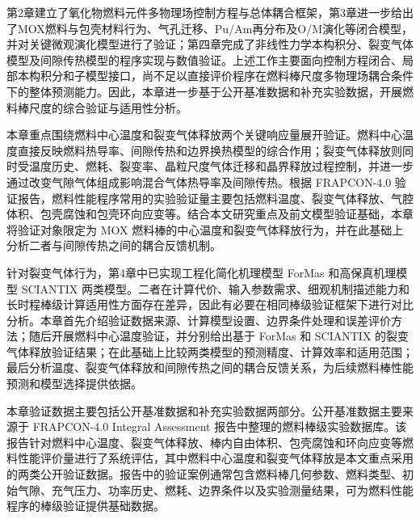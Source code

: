 


第2章建立了氧化物燃料元件多物理场控制方程与总体耦合框架，第3章进一步给出了MOX燃料与包壳材料行为、气孔迁移、Pu/Am再分布及O/M演化等闭合模型，并对关键微观演化模型进行了验证；第四章完成了非线性力学本构积分、裂变气体模型及间隙传热模型的程序实现与数值验证。上述工作主要面向控制方程闭合、局部本构积分和子模型接口，尚不足以直接评价程序在燃料棒尺度多物理场耦合条件下的整体预测能力。因此，本章进一步基于公开基准数据和补充实验数据，开展燃料棒尺度的综合验证与适用性分析。

本章重点围绕燃料中心温度和裂变气体释放两个关键响应量展开验证。燃料中心温度直接反映燃料热导率、间隙传热和边界换热模型的综合作用；裂变气体释放则同时受温度历史、燃耗、裂变率、晶粒尺度气体迁移和晶界释放过程控制，并进一步通过改变气隙气体组成影响混合气体热导率及间隙传热。根据 FRAPCON-4.0 验证报告，燃料性能程序常用的实验验证量主要包括燃料温度、裂变气体释放、气腔体积、包壳腐蚀和包壳环向应变等。结合本文研究重点及前文模型验证基础，本章将验证对象限定为 MOX 燃料棒的中心温度和裂变气体释放行为，并在此基础上分析二者与间隙传热之间的耦合反馈机制。

针对裂变气体行为，第4章中已实现工程化简化机理模型 ForMas 和高保真机理模型 SCIANTIX 两类模型。二者在计算代价、输入参数需求、细观机制描述能力和长时程棒级计算适用性方面存在差异，因此有必要在相同棒级验证框架下进行对比分析。本章首先介绍验证数据来源、计算模型设置、边界条件处理和误差评价方法；随后开展燃料中心温度验证，并分别给出基于 ForMas 和 SCIANTIX 的裂变气体释放验证结果；在此基础上比较两类模型的预测精度、计算效率和适用范围；最后分析温度、裂变气体释放和间隙传热之间的耦合反馈关系，为后续燃料棒性能预测和模型选择提供依据。



本章验证数据主要包括公开基准数据和补充实验数据两部分。公开基准数据主要来源于 FRAPCON-4.0 Integral Assessment 报告中整理的燃料棒级实验数据库。该报告针对燃料中心温度、裂变气体释放、棒内自由体积、包壳腐蚀和环向应变等燃料性能评价量进行了系统评估，其中燃料中心温度和裂变气体释放是本文重点采用的两类公开验证数据。报告中的验证案例通常包含燃料棒几何参数、燃料类型、初始气隙、充气压力、功率历史、燃耗、边界条件以及实验测量结果，可为燃料性能程序的棒级验证提供基础数据。

